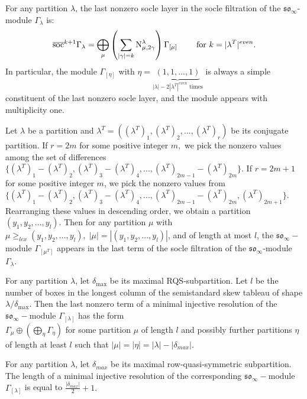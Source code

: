 \documentclass[main.tex]{subfiles}
\begin{document}
\begin{prop}
    \label{so-socle-filtr-height}
    For any partition $\lambda$, the last nonzero socle layer in the socle filtration of the $\mathfrak{so}_\infty$-module $\Gamma_\lambda$ is:
    $$
    \overline{\text{soc}}^{k+1}\Gamma_\lambda = \bigoplus\limits_{\mu} \left( \sum\limits_{|\gamma|=k} \text{N}^{\lambda}_{\mu, 2\gamma} \right) \Gamma_{[\mu]}
    \hspace{0.7cm} \text{ for } k = |\lambda^T|^{even}.
    $$
    In particular, the module $\Gamma_{[\eta]}$ with $\eta = \underbrace{(1,1,...,1)}_{|\lambda| - 2|\lambda^T|^{even}\text{ times}}$ is always a simple constituent of the last nonzero socle layer, and the module appears with multiplicity one.
\end{prop}
\bigskip
\begin{prop}
    \label{so-soc-last-term-general}
     Let $\lambda$ be a partition and $\lambda^T= ((\lambda^T)_1, (\lambda^T)_2, ..., (\lambda^T)_{r})$ be its conjugate partition. If $r=2m$ for some positive integer $m,$ we pick the nonzero values among the set of differences $\{(\lambda^T)_1-(\lambda^T)_2, (\lambda^T)_3-(\lambda^T)_4, ..., (\lambda^T)_{2m-1}-(\lambda^T)_{2m}\}.$ If $r=2m+1$ for some positive integer $m$, we pick the nonzero values from $\{(\lambda^T)_1-(\lambda^T)_2, (\lambda^T)_3-(\lambda^T)_4, ..., (\lambda^T)_{2m-1}-(\lambda^T)_{2m}, (\lambda^T)_{2m+1}\}.$ Rearranging these  values in descending order, we obtain a partition $(y_1, y_2, ..., y_l)$. 
     Then for any partition $\mu$ with $\mu\geq_{lex}(y_1, y_2, ..., y_l), \; |\mu|=|(y_1, y_2, ..., y_l)|$, and of length at most $l$, the $\mathfrak{so}_\infty-$module $\Gamma_{[\mu^T]}$ appears in the last term of the socle filtration of the $\mathfrak{so}_\infty$-module $\Gamma_\lambda$. 
\end{prop}
\bigskip
\begin{prop}
\label{so-last-res-term}
    For any partition $\lambda$, let $\delta_{\text{max}}$ be its maximal RQS-subpartition. Let $l$ be the number of boxes in the longest column of the semistandard skew tableau of shape $\lambda/\delta_{\text{max}}$. 
    Then the last nonzero term of a minimal injective resolution of the $\mathfrak{so}_\infty-$module $\Gamma_{[\lambda]}$ has the form \\$\Gamma_\mu\oplus(\bigoplus\limits_{\eta}\Gamma_\eta)$ for some partition $\mu$ of length $l$ and possibly further partitions $\eta$ of length at least $l$ such that $|\mu| = |\eta|=|\lambda|-|\delta_{max}|$.
\end{prop}
\bigskip
\begin{crl}
    For any partition $\lambda$, let $\delta_{max}$ be its maximal row-quasi-symmetric subpartition. The length of a minimal injective resolution of the corresponding $\mathfrak{so}_\infty-$module $\Gamma_{[\lambda]}$ is equal to $\frac{|\delta_{max}|}{2}+1.$
\end{crl}
\end{document}
